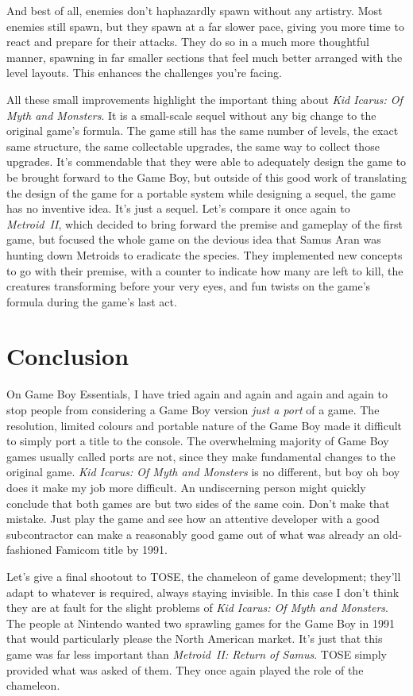 \documentclass{book}
\begin{document}
And best of all, enemies don’t haphazardly spawn without any artistry. Most enemies still spawn, but they spawn at a far slower pace, giving you more time to react and prepare for their attacks. They do so in a much more thoughtful manner, spawning in far smaller sections that feel much better arranged with the level layouts. This enhances the challenges you’re facing.\par
All these small improvements highlight the important thing about \emph{Kid Icarus: Of Myth and Monsters}. It is a small-scale sequel without any big change to the original game’s formula. The game still has the same number of levels, the exact same structure, the same collectable upgrades, the same way to collect those upgrades. It’s commendable that they were able to adequately design the game to be brought forward to the Game Boy, but outside of this good work of translating the design of the game for a portable system while designing a sequel, the game has no inventive idea. It’s just a sequel. Let’s compare it once again to \emph{Metroid~II}, which decided to bring forward the premise and gameplay of the first game, but focused the whole game on the devious idea that Samus Aran was hunting down Metroids to eradicate the species. They implemented new concepts to go with their premise, with a counter to indicate how many are left to kill, the creatures transforming before your very eyes, and fun twists on the game’s formula during the game’s last act.\par
\FloatBarrier\section*{Conclusion}
On Game Boy Essentials, I have tried again and again and again and again to stop people from considering a Game Boy version \emph{just a port} of a game. The resolution, limited colours and portable nature of the Game Boy made it difficult to simply port a title to the console. The overwhelming majority of Game Boy games usually called ports are not, since they make fundamental changes to the original game. \emph{Kid Icarus: Of Myth and Monsters} is no different, but boy oh boy does it make my job more difficult. An undiscerning person might quickly conclude that both games are but two sides of the same coin. Don’t make that mistake. Just play the game and see how an attentive developer with a good subcontractor can make a reasonably good game out of what was already an old-fashioned Famicom title by 1991.\par
Let’s give a final shootout to TOSE, the chameleon of game development; they’ll adapt to whatever is required, always staying invisible. In this case I don’t think they are at fault for the slight problems of \emph{Kid Icarus: Of Myth and Monsters}. The people at Nintendo wanted two sprawling games for the Game Boy in 1991 that would particularly please the North American market. It’s just that this game was far less important than \emph{Metroid~II: Return of Samus}. TOSE simply provided what was asked of them. They once again played the role of the chameleon.\par
\end{document}
